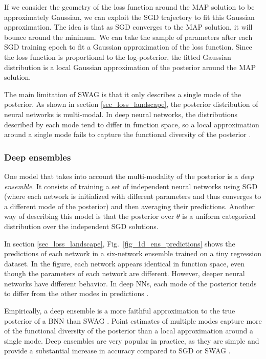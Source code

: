 \documentclass[12pt]{article}
\begin{document}
If we consider the geometry of the loss function around the MAP solution to be approximately Gaussian, we can exploit the SGD trajectory to fit this Gaussian approximation. The idea is that as SGD converges to the MAP solution, it will bounce around the minimum. We can take the sample of parameters after each SGD training epoch to fit a Gaussian approximation of the loss function. Since the loss function is proportional to the log-posterior, the fitted Gaussian distribution is a local Gaussian approximation of the posterior around the MAP solution.

The main limitation of SWAG is that it only describes a single mode of the posterior. As shown in section \ref{sec_loss_landscape}, the posterior distribution of neural networks is multi-modal. In deep neural networks, the distributions described by each mode tend to differ in function space, so a local approximation around a single mode fails to capture the functional diversity of the posterior \cite{deep_ens, multiswag}.

\subsubsection{Deep ensembles}

One model that takes into account the multi-modality of the posterior is a \textit{deep ensemble}. It consists of training a set of independent neural networks using SGD (where each network is initialized with different parameters and thus converges to a different mode of the posterior) and then averaging their predictions. Another way of describing this model is that the posterior over $\theta$ is a uniform categorical distribution over the independent SGD solutions.

In section \ref{sec_loss_landscape}, Fig.\ \ref{fig_1d_ens_predictions} shows the predictions of each network in a six-network ensemble trained on a tiny regression dataset. In the figure, each network appears identical in function space, even though the parameters of each network are different. However, deeper neural networks have different behavior. In deep NNs, each mode of the posterior tends to differ from the other modes in predictions \cite{deep_ens}.

Empirically, a deep ensemble is a more faithful approximation to the true posterior of a BNN than SWAG \cite{bnn_posterior}. Point estimates of multiple modes capture more of the functional diversity of the posterior than a local approximation around a single mode. Deep ensembles are very popular in practice, as they are simple and provide a substantial increase in accuracy compared to SGD or SWAG \cite{multiswag}.
\end{document}
